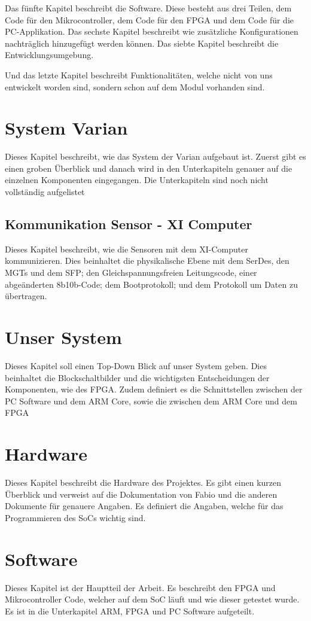 \documentclass{article}
\begin{document}
Das fünfte Kapitel beschreibt die Software. Diese besteht aus drei Teilen, dem Code für den Mikrocontroller, dem Code für den FPGA und dem Code für die PC-Applikation.
Das sechste Kapitel beschreibt wie zusätzliche Konfigurationen nachträglich hinzugefügt werden können.
Das siebte Kapitel beschreibt die Entwicklungsumgebung.

Und das letzte Kapitel beschreibt Funktionalitäten, welche nicht von uns entwickelt worden sind, sondern schon auf dem Modul vorhanden sind.

\section{System Varian}
Dieses Kapitel beschreibt, wie das System der Varian aufgebaut ist. Zuerst gibt es einen groben Überblick und danach wird in den Unterkapiteln genauer auf die einzelnen Komponenten eingegangen. Die Unterkapiteln sind noch nicht vollständig aufgelistet
\subsection{Kommunikation Sensor - XI Computer}
Dieses Kapitel beschreibt, wie die Sensoren mit dem XI-Computer kommunizieren. Dies beinhaltet die physikalische Ebene mit dem SerDes, den MGTs und dem SFP; den Gleichspannungsfreien Leitungscode, einer abgeänderten 8b10b-Code; dem Bootprotokoll; und dem Protokoll um Daten zu übertragen.

\section{Unser System}
Dieses Kapitel soll einen Top-Down Blick auf unser System geben. Dies beinhaltet die Blockschaltbilder und die wichtigsten Entscheidungen der Komponenten, wie des FPGA. Zudem definiert es die Schnittstellen zwischen der PC Software und dem ARM Core, sowie die zwischen dem ARM Core und dem FPGA

\section{Hardware}
Dieses Kapitel beschreibt die Hardware des Projektes. Es gibt einen kurzen Überblick und verweist auf die Dokumentation von Fabio und die anderen Dokumente für genauere Angaben. Es definiert die Angaben, welche für das Programmieren des SoCs wichtig sind.

\section{Software}
Dieses Kapitel ist der Hauptteil der Arbeit. Es beschreibt den FPGA und Mikrocontroller Code, welcher auf dem SoC läuft und wie dieser getestet wurde. Es ist in die Unterkapitel ARM, FPGA und PC Software aufgeteilt.
\end{document}
